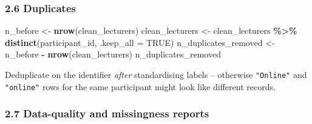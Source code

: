 \documentclass[11pt]{article}
\newenvironment{Shaded}{\begin{snugshade}}{\end{snugshade}}
\newcommand{\AttributeTok}[1]{\textcolor[rgb]{0.13,0.29,0.53}{#1}}
\newcommand{\ConstantTok}[1]{\textcolor[rgb]{0.56,0.35,0.01}{#1}}
\newcommand{\FunctionTok}[1]{\textcolor[rgb]{0.13,0.29,0.53}{\textbf{#1}}}
\newcommand{\NormalTok}[1]{#1}
\newcommand{\OtherTok}[1]{\textcolor[rgb]{0.56,0.35,0.01}{#1}}
\newcommand{\SpecialCharTok}[1]{\textcolor[rgb]{0.81,0.36,0.00}{\textbf{#1}}}
\begin{document}
\hypertarget{duplicates}{%
\subsubsection{2.6 Duplicates}\label{duplicates}}

\begin{Shaded}
\begin{Highlighting}[]
\NormalTok{n\_before }\OtherTok{\textless{}{-}} \FunctionTok{nrow}\NormalTok{(clean\_lecturers)}
\NormalTok{clean\_lecturers }\OtherTok{\textless{}{-}}\NormalTok{ clean\_lecturers }\SpecialCharTok{\%\textgreater{}\%} \FunctionTok{distinct}\NormalTok{(participant\_id, }\AttributeTok{.keep\_all =} \ConstantTok{TRUE}\NormalTok{)}
\NormalTok{n\_duplicates\_removed }\OtherTok{\textless{}{-}}\NormalTok{ n\_before }\SpecialCharTok{{-}} \FunctionTok{nrow}\NormalTok{(clean\_lecturers)}
\NormalTok{n\_duplicates\_removed}
\end{Highlighting}
\end{Shaded}

Deduplicate on the identifier \emph{after} standardising labels --
otherwise \texttt{"Online"} and \texttt{"online"} rows for the same
participant might look like different records.

\hypertarget{data-quality-and-missingness-reports}{%
\subsubsection{2.7 Data-quality and missingness
reports}\label{data-quality-and-missingness-reports}}
\end{document}
